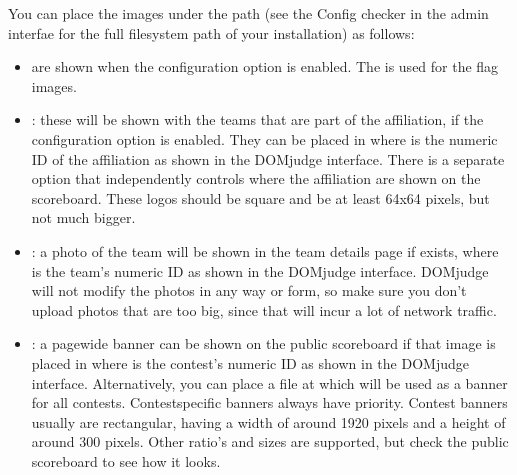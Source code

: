 \documentclass[a4paper,10pt,english,openany]{sphinxmanual}
\begin{document}
\sphinxAtStartPar
You can place the images under the path  (see
the Config checker in the admin interfae for the full filesystem
path of your installation) as follows:
\begin{itemize}
\item {} 
\sphinxAtStartPar
{} are shown when the  configuration option
is enabled. The 
is used for the flag images.

\item {} 
\sphinxAtStartPar
{}: these will be shown with the teams that are
part of the affiliation, if the  configuration
option is enabled. They can be placed in
 where  is the numeric ID
of the affiliation as shown in the DOMjudge interface. There is a
separate option  that independently controls where
the affiliation  are shown on the scoreboard. These logos should be
square and be at least 64x64 pixels, but not much bigger.

\item {} 
\sphinxAtStartPar
{}: a photo of the team will be shown in the team details
page if  exists, where  is the
team’s numeric ID as shown in the DOMjudge interface. DOMjudge will not
modify the photos in any way or form, so make sure you don’t upload photos
that are too big, since that will incur a lot of network traffic.

\item {} 
\sphinxAtStartPar
{}: a page\sphinxhyphen{}wide banner can be shown on the public scoreboard
if that image is placed in  where  is the
contest’s numeric ID as shown in the DOMjudge interface. Alternatively, you
can place a file at  which will be used as a banner
for all contests. Contest\sphinxhyphen{}specific banners always have priority. Contest
banners usually are rectangular, having a width of around 1920 pixels and a
height of around 300 pixels. Other ratio’s and sizes are supported, but check
the public scoreboard to see how it looks.

\end{itemize}
\end{document}

